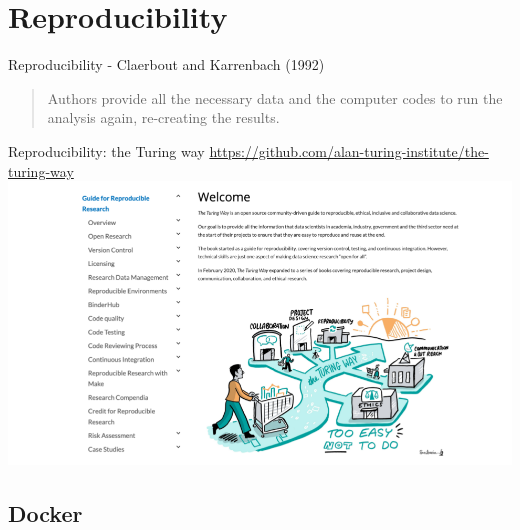 \documentclass[t]{beamer}
\begin{document}
\section{Reproducibility}

\begin{frame}{Reproducibility - Claerbout and Karrenbach (1992)}
    \centering
    \vspace*{\fill}
    \begin{quotation}
        Authors provide all the necessary data and the computer codes to run the analysis again, re-creating the results.
    \end{quotation}
    \vspace*{\fill}
\end{frame}

\begin{frame}{Reproducibility: the Turing way}
    \centering
    \href{https://github.com/alan-turing-institute/the-turing-way}{https://github.com/alan-turing-institute/the-turing-way}
    \includegraphics[width=\linewidth]{figures/TuringWay.png}
\end{frame}

\subsection{Docker}
\end{document}

